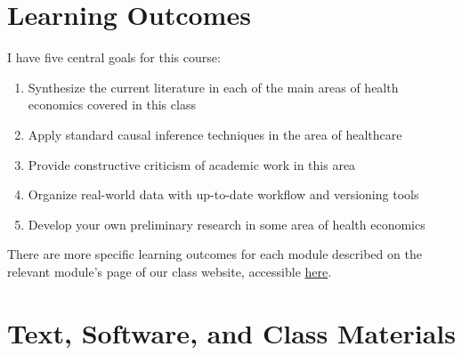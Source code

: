 \documentclass[11pt,]{article}
\begin{document}
\hypertarget{learning-outcomes}{%
\section{Learning Outcomes}\label{learning-outcomes}}

I have five central goals for this course:

\begin{enumerate}
\def\labelenumi{\arabic{enumi}.}
\item
  Synthesize the current literature in each of the main areas of health
  economics covered in this class
\item
  Apply standard causal inference techniques in the area of healthcare
\item
  Provide constructive criticism of academic work in this area
\item
  Organize real-world data with up-to-date workflow and versioning tools
\item
  Develop your own preliminary research in some area of health economics
\end{enumerate}

There are more specific learning outcomes for each module described on
the relevant module's page of our class website, accessible
\href{https://imccart.github.io/Econ-771/}{here}.

\hypertarget{text-software-and-class-materials}{%
\section{Text, Software, and Class
Materials}\label{text-software-and-class-materials}}
\end{document}
